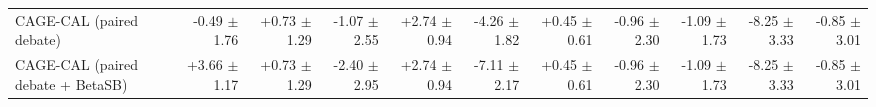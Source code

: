 \begin{tabular}{lrrrrrrrrrr}
CAGE-CAL (paired debate) & -0.49 {\scriptsize $\pm$ 1.76} & +0.73 {\scriptsize $\pm$ 1.29} & -1.07 {\scriptsize $\pm$ 2.55} & +2.74 {\scriptsize $\pm$ 0.94} & -4.26 {\scriptsize $\pm$ 1.82} & +0.45 {\scriptsize $\pm$ 0.61} & -0.96 {\scriptsize $\pm$ 2.30} & -1.09 {\scriptsize $\pm$ 1.73} & -8.25 {\scriptsize $\pm$ 3.33} & -0.85 {\scriptsize $\pm$ 3.01} \\
CAGE-CAL (paired debate + BetaSB) & +3.66 {\scriptsize $\pm$ 1.17} & +0.73 {\scriptsize $\pm$ 1.29} & -2.40 {\scriptsize $\pm$ 2.95} & +2.74 {\scriptsize $\pm$ 0.94} & -7.11 {\scriptsize $\pm$ 2.17} & +0.45 {\scriptsize $\pm$ 0.61} & -0.96 {\scriptsize $\pm$ 2.30} & -1.09 {\scriptsize $\pm$ 1.73} & -8.25 {\scriptsize $\pm$ 3.33} & -0.85 {\scriptsize $\pm$ 3.01} \\
\bottomrule
\end{tabular}
